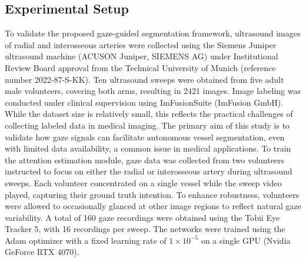 \subsection{Experimental Setup}\label{sec:implementation}
To validate the proposed gaze-guided segmentation framework, ultrasound images of radial and interosseous arteries were collected using the Siemens Juniper ultrasound machine (ACUSON Juniper, SIEMENS AG) under Institutional Review Board approval from the Technical University of Munich (reference number 2022-87-S-KK). Ten ultrasound sweeps were obtained from five adult male volunteers, covering both arms, resulting in $2421$ images. Image labeling was conducted under clinical supervision using ImFusionSuite (ImFusion GmbH).
While the dataset size is relatively small, this reflects the practical challenges of collecting labeled data in medical imaging. The primary aim of this study is to validate how gaze signals can facilitate autonomous vessel segmentation, even with limited data availability, a common issue in medical applications.
To train the attention estimation module, gaze data was collected from two volunteers instructed to focus on either the radial or interosseous artery during ultrasound sweeps. Each volunteer concentrated on a single vessel while the sweep video played, capturing their ground truth intention. To enhance robustness, volunteers were allowed to occasionally glanced at other image regions to reflect natural gaze variability. A total of 160 gaze recordings were obtained using the Tobii Eye Tracker 5, with 16 recordings per sweep.
The networks were trained using the Adam optimizer with a fixed learning rate of $1\times10^{-5}$ on a single GPU (Nvidia GeForce RTX 4070).

